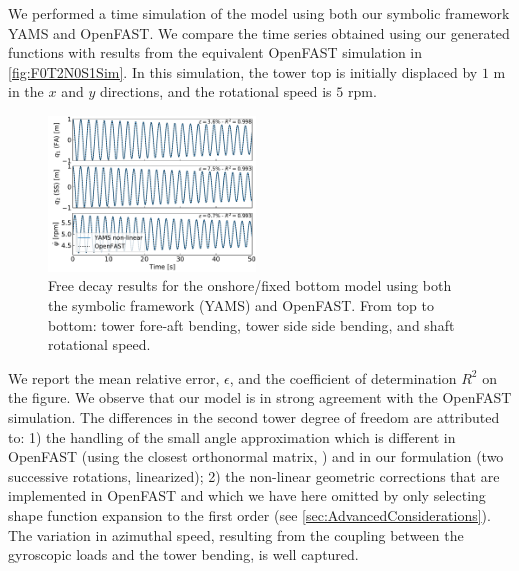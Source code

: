 \documentclass[wes, manuscript]{copernicus}
\begin{document}
We performed a time simulation of the model using both our symbolic framework YAMS and OpenFAST.
We compare the time series obtained using our generated functions with results from the equivalent OpenFAST simulation in \autoref{fig:F0T2N0S1Sim}.
In this simulation, the tower top is initially displaced by $1$ \unit{m} in the $x$ and $y$ directions, and the rotational speed is $5$ \unit{rpm}.
\noindent\begin{figure}[!htb]\centering%
  \includegraphics[width=0.49\textwidth]{figs/F0T2N0S1Sim}
  \caption{Free decay results for the onshore/fixed bottom model using both the symbolic framework (YAMS) and OpenFAST. From top to bottom: tower fore-aft bending, tower side side bending, and shaft rotational speed.}\label{fig:F0T2N0S1Sim}%
\end{figure}
We report the mean relative error, $\epsilon$, and the coefficient of determination $R^2$ on the figure.
We observe that our model is in strong agreement with the OpenFAST simulation.
The differences in the second tower degree of freedom are attributed to: 1) the handling of the small angle approximation which is different in OpenFAST (using the closest orthonormal matrix, \cite{Jonkman:2009}) and in our formulation (two successive rotations, linearized); 2) the non-linear geometric corrections that are implemented in OpenFAST and which we have here omitted by only selecting shape function expansion to the first order (see \autoref{sec:AdvancedConsiderations}). 
The variation in azimuthal speed, resulting from the coupling between the gyroscopic loads and the tower bending, is well captured. 
\end{document}
